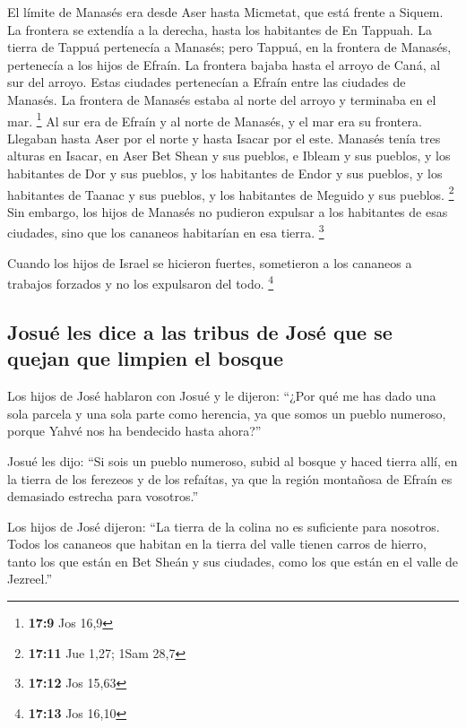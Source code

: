 El límite de Manasés era desde Aser hasta Micmetat, que
está frente a Siquem. La frontera se extendía a la derecha, hasta los
habitantes de En Tappuah.  La tierra de Tappuá pertenecía
a Manasés; pero Tappuá, en la frontera de Manasés, pertenecía a los
hijos de Efraín.  La frontera bajaba hasta el arroyo de
Caná, al sur del arroyo. Estas ciudades pertenecían a Efraín entre las
ciudades de Manasés. La frontera de Manasés estaba al norte del arroyo y
terminaba en el mar. \footnote{\textbf{17:9} Jos 16,9} 
Al sur era de Efraín y al norte de Manasés, y el mar era su frontera.
Llegaban hasta Aser por el norte y hasta Isacar por el este.
 Manasés tenía tres alturas en Isacar, en Aser Bet Shean
y sus pueblos, e Ibleam y sus pueblos, y los habitantes de Dor y sus
pueblos, y los habitantes de Endor y sus pueblos, y los habitantes de
Taanac y sus pueblos, y los habitantes de Meguido y sus pueblos.
\footnote{\textbf{17:11} Jue 1,27; 1Sam 28,7}  Sin
embargo, los hijos de Manasés no pudieron expulsar a los habitantes de
esas ciudades, sino que los cananeos habitarían en esa tierra.
\footnote{\textbf{17:12} Jos 15,63}

 Cuando los hijos de Israel se hicieron fuertes,
sometieron a los cananeos a trabajos forzados y no los expulsaron del
todo. \footnote{\textbf{17:13} Jos 16,10}

\hypertarget{josuuxe9-les-dice-a-las-tribus-de-josuxe9-que-se-quejan-que-limpien-el-bosque}{%
\subsection{Josué les dice a las tribus de José que se quejan que
limpien el
bosque}\label{josuuxe9-les-dice-a-las-tribus-de-josuxe9-que-se-quejan-que-limpien-el-bosque}}

 Los hijos de José hablaron con Josué y le dijeron:
``¿Por qué me has dado una sola parcela y una sola parte como herencia,
ya que somos un pueblo numeroso, porque Yahvé nos ha bendecido hasta
ahora?''

 Josué les dijo: ``Si sois un pueblo numeroso, subid al
bosque y haced tierra allí, en la tierra de los ferezeos y de los
refaítas, ya que la región montañosa de Efraín es demasiado estrecha
para vosotros.''

 Los hijos de José dijeron: ``La tierra de la colina no
es suficiente para nosotros. Todos los cananeos que habitan en la tierra
del valle tienen carros de hierro, tanto los que están en Bet Sheán y
sus ciudades, como los que están en el valle de Jezreel.''


